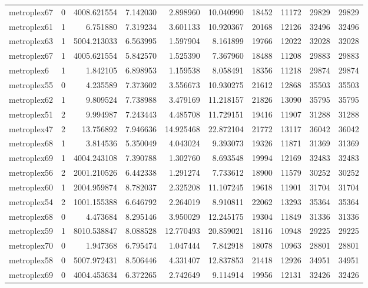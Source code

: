 \begin{longtable}{|l|r|r|r|r|r|r|r|r|r|}
metroplex67 & 0 & 4008.621554 & 7.142030 & 2.898960 & 10.040990 & 18452 & 11172 & 29829 & 29829 \\
metroplex61 & 1 & 6.751880 & 7.319234 & 3.601133 & 10.920367 & 20168 & 12126 & 32496 & 32496 \\
metroplex63 & 1 & 5004.213033 & 6.563995 & 1.597904 & 8.161899 & 19766 & 12022 & 32028 & 32028 \\
metroplex67 & 1 & 4005.621554 & 5.842570 & 1.525390 & 7.367960 & 18488 & 11208 & 29883 & 29883 \\
metroplex6 & 1 & 1.842105 & 6.898953 & 1.159538 & 8.058491 & 18356 & 11218 & 29874 & 29874 \\
metroplex55 & 0 & 4.235589 & 7.373602 & 3.556673 & 10.930275 & 21612 & 12868 & 35503 & 35503 \\
metroplex62 & 1 & 9.809524 & 7.738988 & 3.479169 & 11.218157 & 21826 & 13090 & 35795 & 35795 \\
metroplex51 & 2 & 9.994987 & 7.243443 & 4.485708 & 11.729151 & 19416 & 11907 & 31288 & 31288 \\
metroplex47 & 2 & 13.756892 & 7.946636 & 14.925468 & 22.872104 & 21772 & 13117 & 36042 & 36042 \\
metroplex68 & 1 & 3.814536 & 5.350049 & 4.043024 & 9.393073 & 19326 & 11871 & 31369 & 31369 \\
metroplex69 & 1 & 4004.243108 & 7.390788 & 1.302760 & 8.693548 & 19994 & 12169 & 32483 & 32483 \\
metroplex56 & 2 & 2001.210526 & 6.442338 & 1.291274 & 7.733612 & 18900 & 11579 & 30252 & 30252 \\
metroplex60 & 1 & 2004.959874 & 8.782037 & 2.325208 & 11.107245 & 19618 & 11901 & 31704 & 31704 \\
metroplex54 & 2 & 1001.155388 & 6.646792 & 2.264019 & 8.910811 & 22062 & 13293 & 35364 & 35364 \\
metroplex68 & 0 & 4.473684 & 8.295146 & 3.950029 & 12.245175 & 19304 & 11849 & 31336 & 31336 \\
metroplex59 & 1 & 8010.538847 & 8.088528 & 12.770493 & 20.859021 & 18116 & 10948 & 29225 & 29225 \\
metroplex70 & 0 & 1.947368 & 6.795474 & 1.047444 & 7.842918 & 18078 & 10963 & 28801 & 28801 \\
metroplex58 & 0 & 5007.972431 & 8.506446 & 4.331407 & 12.837853 & 21418 & 12926 & 34951 & 34951 \\
metroplex69 & 0 & 4004.453634 & 6.372265 & 2.742649 & 9.114914 & 19956 & 12131 & 32426 & 32426 \\

\end{longtable}

